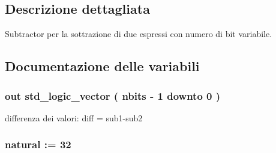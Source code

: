 \subsection{Descrizione dettagliata}
Subtractor per la sottrazione di due espressi con numero di bit variabile. 



\subsection{Documentazione delle variabili}
\hypertarget{group___subtractor_ga0fa68103d429fdc11539b6baa81d0d0d}{
\subsubsection[{diff}]{ {\bfseries \textcolor{vhdlchar}{out}\textcolor{vhdlchar}{ }} {\bfseries \textcolor{vhdlchar}{std\+\_\+logic\+\_\+vector}\textcolor{vhdlchar}{ }\textcolor{vhdlchar}{(}\textcolor{vhdlchar}{ }\textcolor{vhdlchar}{ }\textcolor{vhdlchar}{ }\textcolor{vhdlchar}{ }{\bfseries {\bf nbits}} \textcolor{vhdlchar}{-\/}\textcolor{vhdlchar}{ } \textcolor{vhdldigit}{1} \textcolor{vhdlchar}{ }\textcolor{vhdlchar}{downto}\textcolor{vhdlchar}{ }\textcolor{vhdlchar}{ } \textcolor{vhdldigit}{0} \textcolor{vhdlchar}{ }\textcolor{vhdlchar}{)}\textcolor{vhdlchar}{ }} \hspace{0.3cm}{\ttfamily [Port]}}}\label{group___subtractor_ga0fa68103d429fdc11539b6baa81d0d0d}


differenza dei valori\+: diff = sub1-\/sub2 

\hypertarget{group___subtractor_ga0a6af6eef40212dbaf130d57ce711256}{
\subsubsection[{ieee}]{\hspace{0.3cm}{\ttfamily [Library]}}}\label{group___subtractor_ga0a6af6eef40212dbaf130d57ce711256}
\hypertarget{group___subtractor_gae1435c07d0cd54b521535e2f8de6f94e}{
\subsubsection[{nbits}]{ {\bfseries \textcolor{vhdlchar}{ }} {\bfseries \textcolor{vhdlchar}{natural}\textcolor{vhdlchar}{ }\textcolor{vhdlchar}{ }\textcolor{vhdlchar}{\+:}\textcolor{vhdlchar}{=}\textcolor{vhdlchar}{ }\textcolor{vhdlchar}{ } \textcolor{vhdldigit}{32} \textcolor{vhdlchar}{ }} \hspace{0.3cm}{\ttfamily [Generic]}}}\label{group___subtractor_gae1435c07d0cd54b521535e2f8de6f94e}


